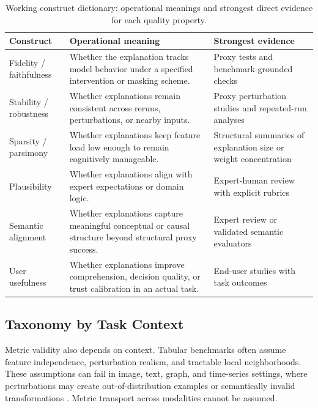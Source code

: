 \documentclass[10pt]{article}
\begin{document}
\begin{table}[t]
\centering
\caption{Working construct dictionary: operational meanings and strongest
direct evidence for each quality property.}
\begin{tabularx}{\linewidth}{l X X}
\toprule
\textbf{Construct} & \textbf{Operational meaning} & \textbf{Strongest evidence} \\
\midrule
Fidelity / faithfulness & Whether the explanation tracks model behavior under a specified intervention or masking scheme. & Proxy tests and benchmark-grounded checks \\
Stability / robustness & Whether explanations remain consistent across reruns, perturbations, or nearby inputs. & Proxy perturbation studies and repeated-run analyses \\
Sparsity / parsimony & Whether explanations keep feature load low enough to remain cognitively manageable. & Structural summaries of explanation size or weight concentration \\
Plausibility & Whether explanations align with expert expectations or domain logic. & Expert-human review with explicit rubrics \\
Semantic alignment & Whether explanations capture meaningful conceptual or causal structure beyond structural proxy success. & Expert review or validated semantic evaluators \\
User usefulness & Whether explanations improve comprehension, decision quality, or trust calibration in an actual task. & End-user studies with task outcomes \\
\bottomrule
\end{tabularx}
\label{tab:constructs}
\end{table}

\subsection{Taxonomy by Task Context}

Metric validity also depends on context. Tabular benchmarks often assume
feature independence, perturbation realism, and tractable local
neighborhoods. These assumptions can fail in image, text, graph, and
time-series settings, where perturbations may create out-of-distribution
examples or semantically invalid transformations
\citep{agarwal2023gnn_eval,proszewska2025bxaic}. Metric transport across
modalities cannot be assumed.
\end{document}
